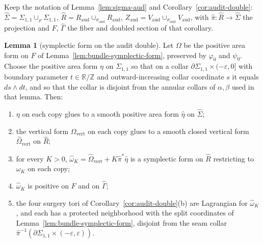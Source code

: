 \documentclass[11pt]{article}
\theoremstyle{definition}
\newtheorem{lemma}[theorem]{Lemma}
\begin{document}
Keep the notation of Lemma~\ref{lem:sigma-aud} and
Corollary~\ref{cor:audit-double}: $\hat\Sigma=\Sigma_{1,1}\cup_\rho\Sigma_{1,1}$,
$\hat R=R_{\mathrm{aud}}\cup_{\sigma_{\mathrm{aud}}}R_{\mathrm{aud}}$,
$Z_{\mathrm{aud}}=V_{\mathrm{aud}}\cup_{\sigma_{\mathrm{aud}}}V_{\mathrm{aud}}$,
with $\hat\pi\colon\hat R\to\hat\Sigma$ the projection and $F$, $\hat\Gamma$
the fiber and doubled section of that corollary.

\begin{lemma}[symplectic form on the audit double]\label{lem:double-form}
Let $\Omega$ be the positive area form on $F$ of
Lemma~\ref{lem:bundle-symplectic-form}, preserved by $\varphi_0$ and
$\psi_0$.  Choose the positive area form $\eta$ on $\Sigma_{1,1}$ so that on
a collar $\partial\Sigma_{1,1}\times(-\varepsilon,0]$ with boundary parameter
$t\in\mathbb R/\mathbb Z$ and outward-increasing collar coordinate $s$ it
equals $ds\wedge dt$, and so that the collar is disjoint from the annular
collars of $\alpha,\beta$ used in that lemma.  Then:
\begin{enumerate}
\item[(i)] $\eta$ on each copy glues to a smooth positive area form
 $\hat\eta$ on $\hat\Sigma$;
\item[(ii)] the vertical form $\Omega_{\mathrm{vert}}$ on each copy glues to
 a smooth closed vertical form $\hat\Omega_{\mathrm{vert}}$ on $\hat R$;
\item[(iii)] for every $K>0$,
 $\hat\omega_K=\hat\Omega_{\mathrm{vert}}+K\hat\pi^*\hat\eta$ is a
 symplectic form on $\hat R$ restricting to $\omega_K$ on each copy;
\item[(iv)] $\hat\omega_K$ is positive on $F$ and on $\hat\Gamma$;
\item[(v)] the four surgery tori of Corollary~\ref{cor:audit-double}(b) are
 Lagrangian for $\hat\omega_K$, and each has a protected neighborhood with
 the split coordinates of Lemma~\ref{lem:bundle-symplectic-form}, disjoint
 from the seam collar $\hat\pi^{-1}(\partial\Sigma_{1,1}\times(-\varepsilon,\varepsilon))$.
\end{enumerate}
\end{lemma}
\end{document}
